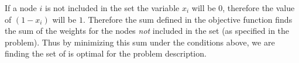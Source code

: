 \documentclass[11pt, oneside]{article}   	%
\begin{document}
If a node $i$ is not included in the set the variable $x_i$ will be $0$, therefore the value of $(1 - x_i)$ will be $1$. 
Therefore the sum defined in the objective function finds the sum of the weights for the nodes \emph{not} included in the set (as specified in the problem). 
Thus by minimizing this sum under the conditions above, we are finding the set of is optimal for the problem description. 
\end{document}
